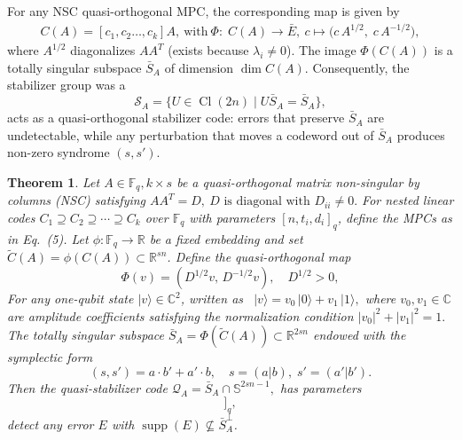 \documentclass{iopjournal}
\theoremstyle{thmstyleone}%
\newtheorem{theorem}{Theorem}
\theoremstyle{thmstyletwo}%
\theoremstyle{thmstylethree}%
\begin{document}
For any NSC quasi-orthogonal MPC, the corresponding map is given by %
\begin{equation}
\begin{aligned}
C(A)=[c_1, c_2\dots,c_k]A, ~\text{with}~
\Phi:\;C(A)\to\bar{E},~
c\mapsto\bigl(c\,A^{1/2},\;c\,A^{-1/2}\bigr), \label{NSC}
\end{aligned}
\end{equation}
where $A^{1/2}$ diagonalizes $AA^{\!T}$ (exists because $\lambda_i\neq0$).  The image $\Phi(C(A))$ is a totally singular subspace $\bar{S}_A$ of dimension $\dim C(A)$.  
Consequently, the stabilizer group was a
\begin{equation}
\mathcal{S}_A=\bigl\{U\in\operatorname{Cl}(2n)\;\big|\;U\bar{S}_A=\bar{S}_A\bigr\}, \label{stabilizer}
\end{equation}
acts as a quasi-orthogonal stabilizer code: errors that preserve $\bar{S}_A$ are undetectable, while any perturbation that moves a codeword out of $\bar{S}_A$ produces non-zero syndrome $(s,s')$.


\begin{theorem}
\label{thm:quasi-ortho-stabilizer}
Let $A \in \mathbb{F}_q,{k \times s}$ be a quasi-orthogonal matrix  non-singular by columns (NSC) satisfying
$A A^T = D,~D \text{ is diagonal with } D_{ii} \neq 0.$
For nested linear codes \(C_1 \supseteq C_2 \supseteq \cdots \supseteq C_k\) over \(\mathbb{F}_q\) with parameters \([n, t_i, d_i]_q\), define the MPCs as in Eq.~(5). 
Let $\phi: \mathbb{F}_q \to \mathbb{R}$ be a fixed embedding and set $\tilde{C}(A) = \phi(C(A)) \subset \mathbb{R}^{sn}$.  
Define the quasi-orthogonal map
\begin{equation}
\Phi(v) = (D^{1/2}v,\, D^{-1/2}v), \quad D^{1/2} > 0,
\end{equation}
For any one-qubit state \( |v\rangle \in \mathbb{C}^2 \), written as ~\(|v\rangle = v_0\,|0\rangle + v_1\,|1\rangle,\) where \(v_0, v_1 \in \mathbb{C}\) are amplitude coefficients satisfying the
normalization condition
\(|v_0|^2 + |v_1|^2 = 1.\)
The totally singular subspace $\bar{S}_A = \Phi(\tilde{C}(A)) \subset \mathbb{R}^{2sn}$ endowed with the symplectic form
\begin{equation}
(s,s') = a \cdot b' + a' \cdot b, \quad s = (a|b), \; s' = (a'|b'). \label{ss}
\end{equation}
Then the quasi-stabilizer code \(
\mathcal{Q}_A = \bar{S}_A \cap \mathbb{S}^{2sn-1},
\)
has parameters
\begin{equation}
[[sn,\;\dim C(A) - sn,\; d \ge \min_i (s+1-i)d_i]]_q,\label{min distance}
\end{equation}
detect any error $E$ with $\operatorname{supp}(E) \not\subseteq \bar{S}_A^\perp$.
\end{theorem}
\end{document}
